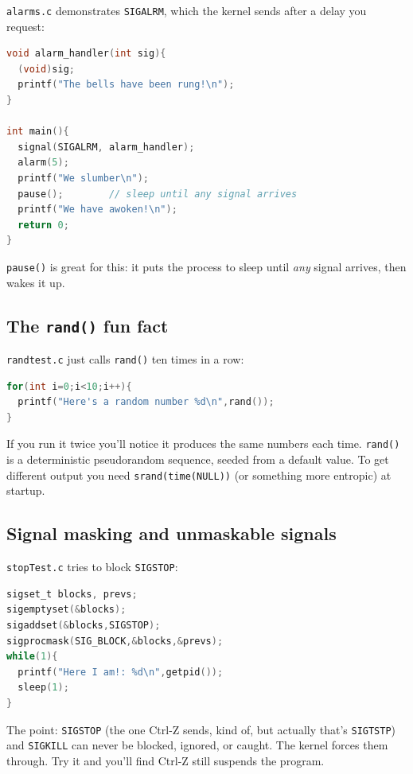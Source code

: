 \documentclass[11pt]{article}
\begin{document}
\texttt{alarms.c} demonstrates \texttt{SIGALRM}, which the kernel
sends after a delay you request:

\begin{lstlisting}[language=C]
void alarm_handler(int sig){
  (void)sig;
  printf("The bells have been rung!\n");
}

int main(){
  signal(SIGALRM, alarm_handler);
  alarm(5);
  printf("We slumber\n");
  pause();        // sleep until any signal arrives
  printf("We have awoken!\n");
  return 0;
}
\end{lstlisting}

\texttt{pause()} is great for this: it puts the process to sleep
until \emph{any} signal arrives, then wakes it up.

\subsection*{The \texttt{rand()} fun fact}

\texttt{randtest.c} just calls \texttt{rand()} ten times in a row:

\begin{lstlisting}[language=C]
for(int i=0;i<10;i++){
  printf("Here's a random number %d\n",rand());
}
\end{lstlisting}

If you run it twice you'll notice it produces the same numbers each
time. \texttt{rand()} is a deterministic pseudorandom sequence,
seeded from a default value. To get different output you need
\texttt{srand(time(NULL))} (or something more entropic) at startup.

\subsection*{Signal masking and unmaskable signals}

\texttt{stopTest.c} tries to block \texttt{SIGSTOP}:

\begin{lstlisting}[language=C]
sigset_t blocks, prevs;
sigemptyset(&blocks);
sigaddset(&blocks,SIGSTOP);
sigprocmask(SIG_BLOCK,&blocks,&prevs);
while(1){
  printf("Here I am!: %d\n",getpid());
  sleep(1);
}
\end{lstlisting}

The point: \texttt{SIGSTOP} (the one Ctrl-Z sends, kind of, but
actually that's \texttt{SIGTSTP}) and \texttt{SIGKILL} can never be
blocked, ignored, or caught. The kernel forces them through. Try it
and you'll find Ctrl-Z still suspends the program.
\end{document}
